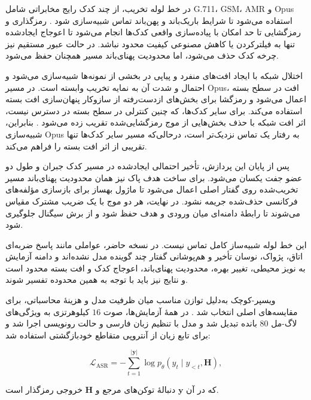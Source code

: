 در خط لوله تخریب، از چند کدک رایج مخابراتی شامل G.711، GSM، AMR و Opus استفاده می‌شود تا شرایط باریک‌باند و پهن‌باند تماس شبیه‌سازی شود . رمزگذاری و رمزگشایی تا حد امکان با پیاده‌سازی واقعی کدک‌ها انجام می‌شود تا اعوجاج ایجادشده تنها به فیلترکردن یا کاهش مصنوعی کیفیت محدود نباشد. در حالت عبور مستقیم نیز چرخه کدک حذف می‌شود، اما محدودیت پهنای‌باند مسیر همچنان حفظ می‌شود.

اختلال شبکه با ایجاد افت‌های منفرد و پیاپی در بخشی از نمونه‌ها شبیه‌سازی می‌شود و احتمال و شدت آن به نمایه تخریب وابسته است. در مسیر Opus، افت در سطح بسته اعمال می‌شود و رمزگشا برای بخش‌های ازدست‌رفته از سازوکار پنهان‌سازی افت بسته استفاده می‌کند. برای سایر کدک‌ها، که چنین کنترلی در سطح بسته در دسترس نیست، اثر افت شبکه با حذف بخش‌هایی از موج رمزگشایی‌شده تقریب زده می‌شود . بنابراین، شبیه‌سازی Opus به رفتار یک تماس  نزدیک‌تر است، درحالی‌که مسیر سایر کدک‌ها تنها تقریبی از اثر افت بسته را فراهم می‌کند.

پس از پایان این پردازش، تأخیر احتمالی ایجادشده در مسیر کدک جبران و طول دو عضو جفت یکسان می‌شود. برای ساخت هدف پاک نیز همان محدودیت پهنای‌باند مسیر تخریب‌شده روی گفتار اصلی اعمال می‌شود تا ماژول بهساز برای بازسازی مؤلفه‌های فرکانسی حذف‌شده جریمه نشود. در نهایت، هر دو موج با یک ضریب مشترک مقیاس می‌شوند تا رابطهٔ دامنه‌ای میان ورودی و هدف حفظ شود و از برش سیگنال جلوگیری شود.


این خط لوله شبیه‌ساز کامل تماس نیست. در نسخه حاضر، عواملی مانند پاسخ ضربه‌ای اتاق، پژواک، نوسان تأخیر و هم‌پوشانی گفتار چند گوینده مدل نشده‌اند و دامنه آزمایش به نویز محیطی، تغییر بهره، محدودیت پهنای‌باند، اعوجاج کدک و افت بسته محدود است و نتایج نیز باید با توجه به همین محدوده تفسیر شوند.


ویسپر-کوچک به‌دلیل توازن مناسب میان ظرفیت مدل و هزینهٔ محاسباتی، برای مقایسه‌های اصلی انتخاب شد . در همهٔ آزمایش‌ها، صوت $16$ کیلوهرتزی به ویژگی‌های لاگ-مل $80$ بانده تبدیل شد و مدل با تنظیم زبان فارسی و حالت رونویسی اجرا شد و برای تابع زیان از آنتروپی متقاطع خودبازگشتی استفاده شد:

\begin{equation}
\mathcal{L}_{\mathrm{ASR}}=-\sum_{t=1}^{|\mathbf{y}|}
\log p_{\theta}\left(y_t\mid y_{<t},\mathbf{H}\right),
\end{equation}

که در آن $\mathbf{y}$ دنبالهٔ توکن‌های مرجع و $\mathbf{H}$ خروجی رمزگذار است.


